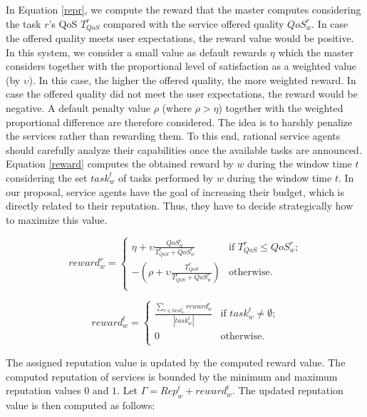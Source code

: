 In Equation \ref{repr}, we compute the reward that the master
computes considering the task $r$'s QoS $T_{QoS}^r$ compared with
the service offered quality $QoS_w^r$. In case the offered quality
meets user expectations, the reward value would be positive. In
this system, we consider a small value as default rewards $\eta$
which the master considers together with the proportional level of
satisfaction as a weighted value (by $\upsilon$). In this case,
the higher the offered quality, the more weighted reward. In case
the offered quality did not meet the user expectations, the reward
would be negative. A default penalty value $\rho$ (where
$\rho>\eta$) together with the weighted proportional difference
are therefore considered. The idea is to harshly penalize the
services rather than rewarding them. To this end, rational service
agents should carefully analyze their capabilities once the
available tasks are announced. Equation \ref{reward} computes the
obtained reward by $w$ during the window time $t$ considering the
set $task_w^t$ of tasks performed by $w$ during the window time
$t$. In our proposal, service agents have the goal of increasing
their budget, which is directly related to their reputation. Thus,
they have to decide strategically how to maximize this value.

\begin{equation} \label{repr}
reward_w^r = \begin{cases}
\eta + \upsilon \frac{QoS_w^r}{T_{QoS}^r+QoS_w^r}   & \text{if $T_{QoS}^r\leq QoS_w^r$;}\\
-(\rho +  \upsilon \frac{T_{QoS}^r}{T_{QoS}^r+QoS_w^r} ) & \text{otherwise.}\\
\end{cases}
\end{equation}


\begin{equation} \label{reward}
reward_w^t =
\begin{cases}
\frac{\sum_{r \in
task_w^t}reward_w^r}{|task_w^t|}& \text{if $task_w^t \neq \emptyset$;}\\
0 & \text{otherwise.}\\
\end{cases}
\end{equation}

The assigned reputation value is updated by the computed reward
value. The computed reputation of services is bounded by the
minimum and maximum reputation values $0$ and $1$. %
Let $\Gamma = Rep_{w}^{t} + reward_w^t$. The updated reputation
value is then computed as follows:


